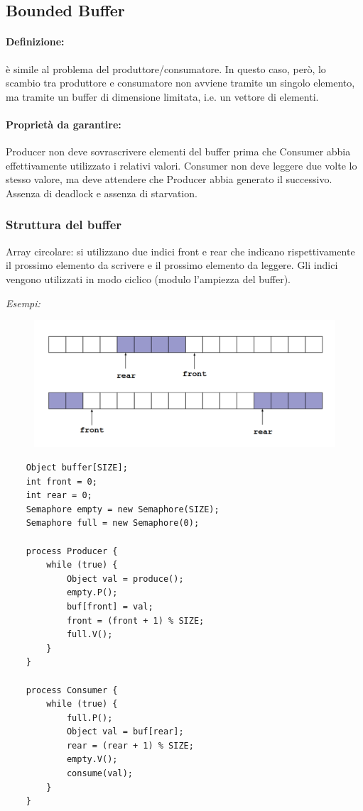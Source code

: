 \subsection{Bounded Buffer}
\paragraph{Definizione:} è simile al problema del produttore/consumatore.
In questo caso, però, lo scambio tra produttore e consumatore non
avviene tramite un singolo elemento, ma tramite un buffer di
dimensione limitata, i.e. un vettore di elementi.
\paragraph{Proprietà da garantire:} Producer non deve sovrascrivere elementi del buffer prima che Consumer abbia effettivamente utilizzato i relativi valori.
Consumer non deve leggere due volte lo stesso valore, ma deve
attendere che Producer abbia generato il successivo.
Assenza di deadlock e assenza di starvation.

\subsubsection{Struttura del buffer}
Array circolare: si utilizzano due indici front e rear che indicano rispettivamente il prossimo elemento da scrivere e il prossimo elemento da leggere. Gli indici vengono utilizzati in modo ciclico (modulo l'ampiezza del buffer).

\textit{Esempi:}
\begin{figure} [h]
    \centering
    \includegraphics[width=0.5\linewidth]{Images/Screenshot 2024-12-28 at 19-31-02 so-03.1-concorrenza - so-03.1-concorrenza.pdf.png}
\end{figure}

\begin{lstlisting}
    Object buffer[SIZE];
    int front = 0;
    int rear = 0;
    Semaphore empty = new Semaphore(SIZE);
    Semaphore full = new Semaphore(0);

    process Producer {
        while (true) {
            Object val = produce();
            empty.P();
            buf[front] = val;
            front = (front + 1) % SIZE;
            full.V();
        }
    }

    process Consumer {
        while (true) {
            full.P();
            Object val = buf[rear];
            rear = (rear + 1) % SIZE;
            empty.V();
            consume(val);
        }
    }
\end{lstlisting}


